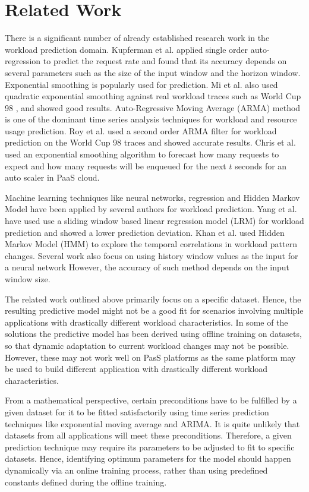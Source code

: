\section{Related Work}

There is a significant number of already established research work in the workload prediction domain. Kupferman et al. \cite{Kupferman_2009} applied single order auto-regression to predict the request rate and found that its accuracy depends on several parameters such as the size of the input window and the horizon window. Exponential smoothing is popularly used for prediction. Mi et al. \cite{Mi_2010} also used quadratic exponential smoothing against real workload traces such as World Cup 98 \cite{WorldCup_1998}, and showed good results. Auto-Regressive Moving Average (ARMA) method is one of the dominant time series analysis techniques for workload and resource usage prediction. Roy et al. \cite{Roy_2011} used a second order ARMA filter for workload prediction on the World Cup 98 traces and showed accurate results. Chris et al. used an exponential smoothing algorithm to forecast how many requests to expect and how many requests will be enqueued for the next $t$ seconds \cite{Bunch_2012} for an auto scaler in PaaS cloud.

Machine learning techniques like neural networks, regression and Hidden Markov Model have been applied by several authors for workload prediction. Yang et al.\cite{Yang_2013} have used use a sliding window based linear regression model (LRM) for workload prediction and showed a lower prediction deviation. Khan et al. \cite{Khan_2012} used Hidden Markov Model (HMM) to explore the temporal correlations in workload pattern changes. Several work also focus on using history window values as the input for a neural network \cite{Islam_2012} However, the accuracy of such method depends on the input window size.

The related work outlined above primarily focus on a specific dataset. Hence, the resulting predictive model might not be a good fit for scenarios involving multiple applications with drastically different workload characteristics. In some of the solutions the predictive model has been derived using offline training on datasets, so that dynamic adaptation to current workload changes may not be possible. However, these may not work well on PasS platforms as the same platform may be used to build different application with drastically different workload characteristics.

From a mathematical perspective, certain preconditions have to be fulfilled by a given dataset for it to be fitted satisfactorily using time series prediction techniques like exponential moving average and ARIMA. It is quite unlikely that datasets from all applications will meet these preconditions. Therefore, a given prediction technique may require its parameters to be adjusted to fit to specific datasets. Hence, identifying optimum parameters for the model should happen dynamically via an online training process, rather than using predefined constants defined during the offline training.